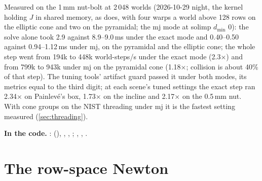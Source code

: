 Measured on the 1\,mm nut-bolt at 2\,048 worlds (2026-10-29 night, the kernel holding $J$ in shared memory, as  does, with four warps a world above 128 rows on the elliptic cone and two on the pyramidal; the mj mode at solimp $d_{\min}$ 0): the solve alone took 2.9 against 8.9--9.0\,ms under the exact mode and 0.40--0.50 against 0.94--1.12\,ms under mj, on the pyramidal and the elliptic cone; the whole step went from 194k to 448k world-steps/s under the exact mode (2.3$\times$) and from 799k to 943k under mj on the pyramidal cone (1.18$\times$; collision is about 40\% of that step). The tuning tools' artifact guard passed it under both modes, its metrics equal to the third digit; at each scene's tuned settings the exact step ran 2.34$\times$ on Painlev\'e's box, 1.73$\times$ on the incline and 2.17$\times$ on the 0.5\,mm nut. With cone groups on the NIST threading under mj it is the fastest setting measured (\cref{sec:threading}).

\begin{codebox}
\textbf{In the code.} :  (), , , ; , , .
\end{codebox}

\section{The row-space Newton}\label{sec:rowspace}

